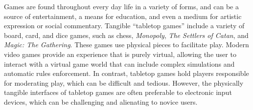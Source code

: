 \documentclass[10pt,twocolumn,letterpaper]{article}
\begin{document}
Games are found throughout every day life in a variety of forms, and
can be a source of entertainment, a means for education, and even a
medium for artistic expression or social commentary.  Tangible
``tabletop games'' include a variety of board, card, and dice games,
such as chess, \emph{Monopoly},
\emph{The Settlers of Catan}, and
\emph{Magic: The Gathering}.
%
These games use physical pieces to facilitate play.  
Modern video games provide an experience that is purely virtual,
allowing the user to interact with a virtual game world that can
include complex simulations and automatic rules enforcement. In
contrast, tabletop games hold players responsible for moderating play,
which can be difficult and tedious. However, the physically
tangible interfaces of tabletop games are often preferable to
electronic input devices, which can be challenging and alienating to
novice users.
\end{document}
